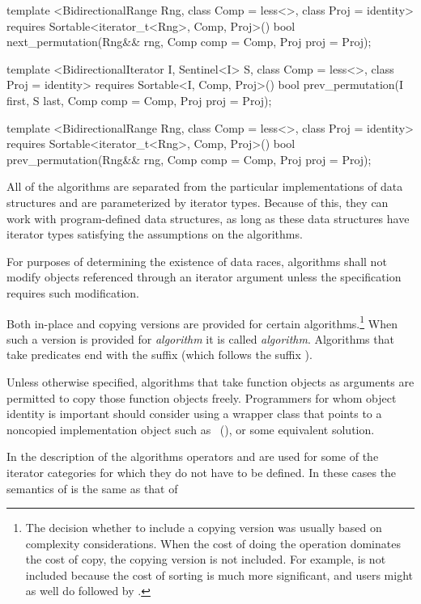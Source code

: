 \begin{codeblock}
{{{{  template <BidirectionalRange Rng, class Comp = less<>,
      class Proj = identity>
    requires Sortable<iterator_t<Rng>, Comp, Proj>()
    bool
      next_permutation(Rng&& rng, Comp comp = Comp{}, Proj proj = Proj{});

  template <BidirectionalIterator I, Sentinel<I> S, class Comp = less<>,
      class Proj = identity>
    requires Sortable<I, Comp, Proj>()
    bool prev_permutation(I first, S last, Comp comp = Comp{}, Proj proj = Proj{});

  template <BidirectionalRange Rng, class Comp = less<>,
      class Proj = identity>
    requires Sortable<iterator_t<Rng>, Comp, Proj>()
    bool
      prev_permutation(Rng&& rng, Comp comp = Comp{}, Proj proj = Proj{});
}}}}
\end{codeblock}

\pnum
All of the algorithms are separated from the particular implementations of data structures and are
parameterized by iterator types.
Because of this, they can work with program-defined data structures, as long
as these data structures have iterator types satisfying the assumptions on the algorithms.

\pnum
For purposes of determining the existence of data races, algorithms shall
not modify objects referenced through an iterator argument unless the
specification requires such modification.

\pnum
Both in-place and copying versions are provided for certain
algorithms.\footnote{The decision whether to include a copying version was
usually based on complexity considerations. When the cost of doing the operation
dominates the cost of copy, the copying version is not included. For example,
 is not included because the cost of sorting is much more
significant, and users might as well do  followed by .}
When such a version is provided for \textit{algorithm} it is called
\textit{algorithm}. Algorithms that take predicates end with the
suffix  (which follows the suffix ).

\pnum
\enternote
Unless otherwise specified, algorithms that take function objects as arguments
are permitted to copy those function objects freely. Programmers for whom object
identity is important should consider using a wrapper class that points to a
noncopied implementation object such as ~(), or some equivalent solution.
\exitnote

\pnum
In the description of the algorithms operators
\tcode{+}
and
\tcode{-}
are used for some of the iterator categories for which
they do not have to be defined.
In these cases the semantics of
is the same as that of

